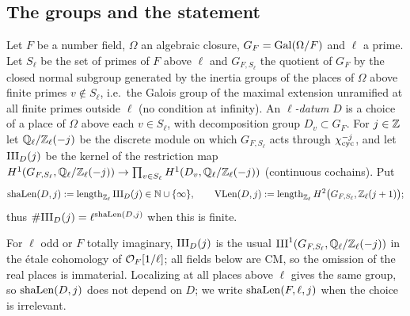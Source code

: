 \subsection{The groups and the statement}\label{sec:window:statement}

\begin{definition}\label{def:window:sha}
Let $F$ be a number field, $\Omega$ an algebraic closure, $G_F=\operatorname{Gal}(\Omega/F)$ and $\ell$ a prime. Let $S_\ell$ be
the set of primes of $F$ above $\ell$ and $G_{F,S_\ell}$ the quotient of $G_F$ by the closed normal subgroup
generated by the inertia groups of the places of $\Omega$ above finite primes $v\notin S_\ell$, i.e.\ the Galois
group of the maximal extension unramified at all finite primes outside $\ell$ (no condition at infinity). An
\emph{$\ell$-datum} $D$ is a choice of a place of $\Omega$ above each $v\in S_\ell$, with decomposition group
$D_v\subset G_F$. For $j\in\mathbb{Z}$ let $\mathbb{Q}_\ell/\mathbb{Z}_\ell(-j)$ be the discrete module on which $G_{F,S_\ell}$ acts through
$\chi_{\mathrm{cyc}}^{-j}$, and let $\mathrm{III}_D(j)$ be the kernel of the restriction map
$H^1(G_{F,S_\ell},\mathbb{Q}_\ell/\mathbb{Z}_\ell(-j))\to\prod_{v\in S_\ell}H^1(D_v,\mathbb{Q}_\ell/\mathbb{Z}_\ell(-j))$ (continuous cochains). Put
\[
  \mathrm{shaLen}(D,j):=\operatorname{length}_{\mathbb{Z}_\ell}\mathrm{III}_D(j)\in\mathbb{N}\cup\{\infty\},\qquad
  \mathrm{VLen}(D,j):=\operatorname{length}_{\mathbb{Z}_\ell}H^2\bigl(G_{F,S_\ell},\mathbb{Z}_\ell(j+1)\bigr);
\]
thus $\#\mathrm{III}_D(j)=\ell^{\mathrm{shaLen}(D,j)}$ when this is finite.
\end{definition}

For $\ell$ odd or $F$ totally imaginary, $\mathrm{III}_D(j)$ is the usual $\mathrm{III}^1(G_{F,S_\ell},\mathbb{Q}_\ell/\mathbb{Z}_\ell(-j))$ in the
\'etale cohomology of $\mathcal{O}_F[1/\ell]$; all fields below are CM, so the omission of the real places is
immaterial. Localizing at all places above $\ell$ gives the same group, so $\mathrm{shaLen}(D,j)$ does not depend on
$D$; we write $\mathrm{shaLen}(F,\ell,j)$ when the choice is irrelevant.

